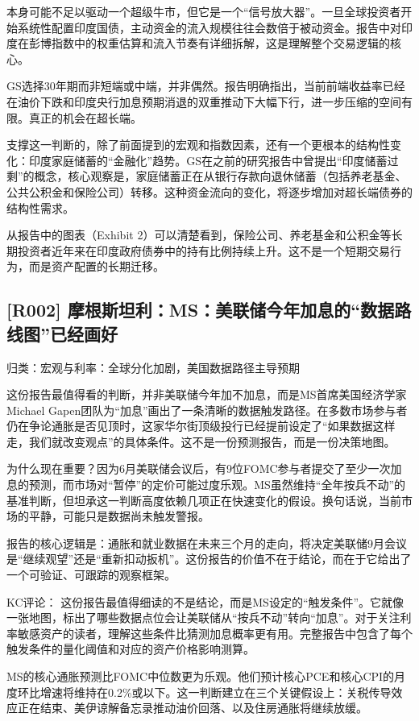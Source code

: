 \documentclass[11pt]{ctexart}
\begin{document}
本身可能不足以驱动一个超级牛市，但它是一个“信号放大器”。一旦全球投资者开始系统性配置印度国债，主动资金的流入规模往往会数倍于被动资金。报告中对印度在彭博指数中的权重估算和流入节奏有详细拆解，这是理解整个交易逻辑的核心。

GS选择30年期而非短端或中端，并非偶然。报告明确指出，当前前端收益率已经在油价下跌和印度央行加息预期消退的双重推动下大幅下行，进一步压缩的空间有限。真正的机会在超长端。

支撑这一判断的，除了前面提到的宏观和指数因素，还有一个更根本的结构性变化：印度家庭储蓄的“金融化”趋势。GS在之前的研究报告中曾提出“印度储蓄过剩”的概念，核心观察是，家庭储蓄正在从银行存款向退休储蓄（包括养老基金、公共公积金和保险公司）转移。这种资金流向的变化，将逐步增加对超长端债券的结构性需求。

从报告中的图表（Exhibit 2）可以清楚看到，保险公司、养老基金和公积金等长期投资者近年来在印度政府债券中的持有比例持续上升。这不是一个短期交易行为，而是资产配置的长期迁移。

\subsection{[R002] 摩根斯坦利：MS：美联储今年加息的“数据路线图”已经画好}
{\small\color{refgray}归类：宏观与利率：全球分化加剧，美国数据路径主导预期}

这份报告最值得看的判断，并非美联储今年加不加息，而是MS首席美国经济学家Michael Gapen团队为“加息”画出了一条清晰的数据触发路径。在多数市场参与者仍在争论通胀是否见顶时，这家华尔街顶级投行已经提前设定了“如果数据这样走，我们就改变观点”的具体条件。这不是一份预测报告，而是一份决策地图。

为什么现在重要？因为6月美联储会议后，有9位FOMC参与者提交了至少一次加息的预测，而市场对“暂停”的定价可能过度乐观。MS虽然维持“全年按兵不动”的基准判断，但坦承这一判断高度依赖几项正在快速变化的假设。换句话说，当前市场的平静，可能只是数据尚未触发警报。

报告的核心逻辑是：通胀和就业数据在未来三个月的走向，将决定美联储9月会议是“继续观望”还是“重新扣动扳机”。这份报告的价值不在于结论，而在于它给出了一个可验证、可跟踪的观察框架。

KC评论： 这份报告最值得细读的不是结论，而是MS设定的“触发条件”。它就像一张地图，标出了哪些数据点位会让美联储从“按兵不动”转向“加息”。对于关注利率敏感资产的读者，理解这些条件比猜测加息概率更有用。完整报告中包含了每个触发条件的量化阈值和对应的资产价格影响测算。

MS的核心通胀预测比FOMC中位数更为乐观。他们预计核心PCE和核心CPI的月度环比增速将维持在0.2\%或以下。这一判断建立在三个关键假设上：关税传导效应正在结束、美伊谅解备忘录推动油价回落、以及住房通胀将继续放缓。
\end{document}
